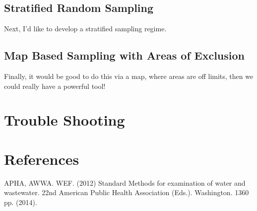 \documentclass[12pt]{../SOP3_beta}\usepackage[]{graphicx}\usepackage[]{color}
\begin{document}
\subsection{Stratified Random Sampling}

\NP Next, I'd like to develop a stratified sampling regime.

\subsection{Map Based Sampling with Areas of Exclusion}

\NP Finally, it would be good to do this via a map, where areas are off limits, then we could really have a powerful tool!



\section{Trouble Shooting}

\section{References}

\NP APHA, AWWA. WEF. (2012) Standard Methods for examination of water and wastewater. 22nd American Public Health Association (Eds.). Washington. 1360 pp. (2014).
\end{document}
